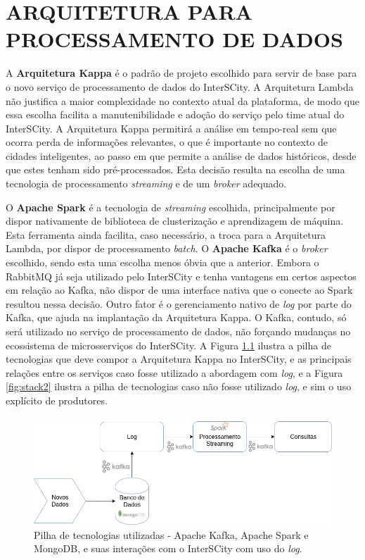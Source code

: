\chapter[ARQUITETURA PARA PROCESSAMENTO DE DADOS]{ARQUITETURA PARA PROCESSAMENTO DE DADOS}
\label{chapter:architecture}

A \textbf{Arquitetura Kappa} é o padrão de projeto escolhido para servir de
base para o novo serviço de processamento de dados do InterSCity. A Arquitetura
Lambda não justifica a maior complexidade no contexto atual da plataforma, de
modo que essa escolha facilita a manutenibilidade e adoção do serviço pelo
time atual do InterSCity. A Arquitetura Kappa permitirá a análise em tempo-real
sem que ocorra perda de informações relevantes, o que é importante no contexto de
cidades inteligentes, ao passo em que permite a análise de dados históricos,
desde que estes tenham sido pré-processados. Esta decisão resulta na escolha de
uma tecnologia de processamento \textit{streaming} e de um
\textit{broker} adequado.

O \textbf{Apache Spark} é a tecnologia de \textit{streaming} escolhida,
principalmente por dispor nativamente de biblioteca de clusterização e
aprendizagem de máquina. Esta ferramenta ainda facilita, caso necessário, a
troca para a Arquitetura Lambda, por dispor de processamento \textit{batch}.
O \textbf{Apache Kafka} é o \textit{broker} escolhido, sendo esta uma escolha
menos óbvia que a anterior. Embora o RabbitMQ já seja utilizado pelo
InterSCity e tenha vantagens em certos aspectos em relação ao Kafka, não
dispor de uma interface nativa que o conecte ao Spark resultou nessa decisão.
Outro fator é o gerenciamento nativo de \textit{log} por parte do
Kafka, que ajuda na implantação da Arquitetura Kappa. O Kafka, contudo, só
será utilizado no serviço de processamento de dados, não forçando mudanças no
ecossistema de microsserviços do InterSCity. A Figura \ref{fig:stack} ilustra
a pilha de tecnologias que deve compor a Arquitetura Kappa no InterSCity, e
as principais relações entre os serviços caso fosse utilizado a abordagem com
\textit{log}, e a Figura \ref{fig:stack2} ilustra a pilha de tecnologias caso
não fosse utilizado \textit{log}, e sim o uso explícito de produtores.

\begin{figure}
  \centering
    \includegraphics[scale=0.5]{figuras/kappa_tools.png}
  \caption{Pilha de tecnologias utilizadas - Apache Kafka, Apache Spark e
    MongoDB, e suas interações com o InterSCity com uso do \textit{log}.}
  \label{fig:stack}
\end{figure}

